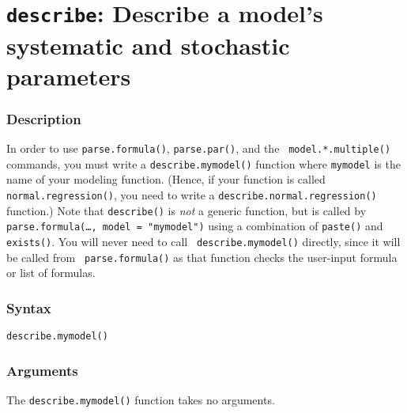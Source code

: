 \section{{\tt describe}: Describe a model's systematic and stochastic 
parameters}
\label{describe.mymodel}

\subsubsection{Description}

In order to use {\tt parse.formula()}, {\tt parse.par()}, and the {\tt
model.*.multiple()} commands, you must write a {\tt describe.mymodel()}
function where {\tt mymodel} is the name of your modeling function.
(Hence, if your function is called {\tt normal.regression()}, you need
to write a {\tt describe.normal.regression()} function.)  Note that
{\tt describe()} is \emph{not} a generic function, but is called by
{\tt parse.formula(\dots, model = "mymodel")} using a combination of
{\tt paste()} and {\tt exists()}.  You will never need to call {\tt
describe.mymodel()} directly, since it will be called from {\tt
parse.formula()} as that function checks the user-input formula or
list of formulas.  

\subsubsection{Syntax}
\begin{verbatim}
describe.mymodel()
\end{verbatim}

\subsubsection{Arguments}\label{categories}
The {\tt describe.mymodel()} function takes no arguments.  


